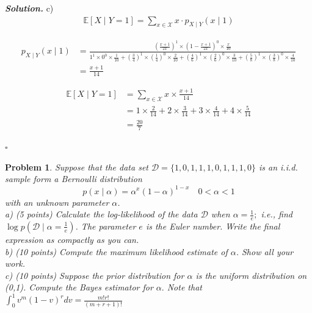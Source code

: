 \documentclass[12pt]{article}
\newtheorem{problem}{Problem}
\newenvironment{solution}[1][\it{Solution}]{\textbf{#1. } }{$\square$}
\begin{document}
\begin{solution}
c)
\begin{align*}
\mathbb{E}[X \mid Y=1]=\sum_{x \in \mathcal{X}} x \cdot p_{X \mid Y}(x \mid 1)
\end{align*}

\begin{align*}
p_{X \mid Y}(x \mid 1)&=\frac{\left(\frac{x+1}{2x}\right)^{1} \times\left(1-\frac{x+1}{2 x}\right)^{0} \times \frac{x}{10}}{1^{1} \times 0^{0} \times \frac{1}{10}+\left(\frac{3}{4}\right)^{1} \times\left(\frac{1}{4}\right)^{0} \times \frac{2}{10} + \left(\frac{4}{6}\right)^{1} \times\left(\frac{2}{6}\right)^{0} \times \frac{3}{10} + \left(\frac{5}{8}\right)^{1} \times\left(\frac{3}{8}\right)^{0} \times \frac{4}{10}}\\
&=\frac{x+1}{14}
\end{align*}

\begin{align*}
\mathbb{E}[X \mid Y=1] &= \sum_{x \in \mathcal{X}} x \times \frac{x + 1}{14}\\
&= 1 \times \frac{2}{14} + 2 \times \frac{3}{14} + 3 \times \frac{4}{14} + 4 \times \frac{5}{14}\\
&= \boxed{\frac{20}{7}} 
\end{align*}

\end{solution}



\begin{problem}
Suppose that the data set $\mathcal{D}=\{1,0,1,1,1,0,1,1,1,0\}$ is an i.i.d. sample form a Bernoulli distribution
$$
p(x \mid \alpha)=\alpha^{x}(1-\alpha)^{1-x} \quad 0<\alpha<1
$$
with an unknown parameter $\alpha$.\\
a) (5 points) Calculate the log-likelihood of the data $\mathcal{D}$ when $\alpha=\frac{1}{e} ;$ i.e., find $\log p(\mathcal{D} \mid \alpha=\frac{1}{e})$. The parameter $e$ is the Euler number. Write the final expression as compactly as you can.\\
b) (10 points) Compute the maximum likelihood estimate of $\alpha$. Show all your work.\\
c) (10 points) Suppose the prior distribution for $\alpha$ is the uniform distribution on (0,1).  Compute the Bayes estimator for $\alpha .$ Note that $\int_{0}^{1} v^{m}(1-v)^{r} d v=\frac{m ! r !}{(m+r+1) !}$
\end{problem}
\end{document}
